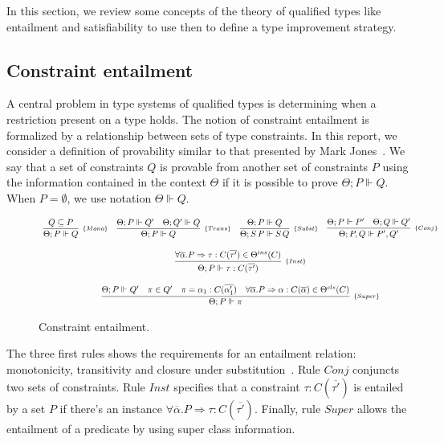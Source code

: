 \documentclass[a4paper, 11pt]{article}
\begin{document}
In this section, we review some concepts of the theory of 
qualified types like entailment and satisfiability to use then 
to define a type improvement strategy.

\subsection{Constraint entailment} 

A central problem in type systems of qualified types is determining 
when a restriction present on a type holds. The notion of 
constraint entailment is formalized by a relationship between 
sets of type constraints. In this report, we consider a definition of 
provability similar to that presented by Mark Jones~\cite{Jones1995}.
We say that a set of constraints $Q$ is provable from another set
of constraints $P$ using the information contained in the 
context $\Theta$ if it is possible to prove $\Theta ; P \Vdash Q$.
When $P = \emptyset$, we use notation $\Theta \Vdash Q$.

\begin{figure}[htb]
  \[
    \begin{array}{cccc}
      \infer[_{\{Mono\}}]
            {\Theta ; P \Vdash Q} 
            {Q \subseteq P} 
      & 
      \infer[_{\{Trans\}}]
            {\Theta ; P \Vdash Q} 
            {\Theta ; P \Vdash Q' 
             & 
             \Theta ; Q' \Vdash Q}
      & 
      \infer[_{\{Subst\}}]
            {\Theta ; S\,P \Vdash S\,Q}
            {\Theta ; P \Vdash Q} 
      & 
      \infer[_{\{Conj\}}]
            {\Theta ; P, Q \Vdash P', Q'}
            {\Theta ; P \Vdash P' & 
             \Theta ; Q \Vdash Q'} 
      \\ \\
      \multicolumn{4}{c}{
        \infer[_{\{Inst\}}]
              {\Theta ; P \Vdash \tau : C(\overline{\tau'}) }
              {\forall \overline{\alpha} .  P \Rightarrow \tau : C(\overline{\tau'}) \in \Theta^{ins}(C)}
      } 
      \\ \\
      \multicolumn{4}{c}{
        \infer[_{\{Super\}}]
              {\Theta ; P \Vdash \pi}
              {\Theta ; P \Vdash Q' & 
               \pi \in Q' &
               \pi = \alpha_1 : C(\overline{\alpha'_1}) & 
               \forall\overline{\alpha}. P \Rightarrow \alpha : C(\overline{\alpha}) \in \Theta^{cls}(C)} 
      }
    \end{array}
  \]
  \centering
  \caption{Constraint entailment.}
\end{figure}
The three first rules shows the requirements for an entailment 
relation: monotonicity, transitivity and closure under 
substitution~\cite{Jones1995}. Rule $Conj$ conjuncts two sets 
of constraints. Rule $Inst$ specifies that a constraint 
$\tau : C(\overline{\tau'})$ is entailed by a set $P$ if 
there's an instance 
$\forall \overline{\alpha} .  P \Rightarrow \tau : C(\overline{\tau'})$. 
Finally, rule $Super$ allows the entailment of a predicate 
by using super class information.
\end{document}
